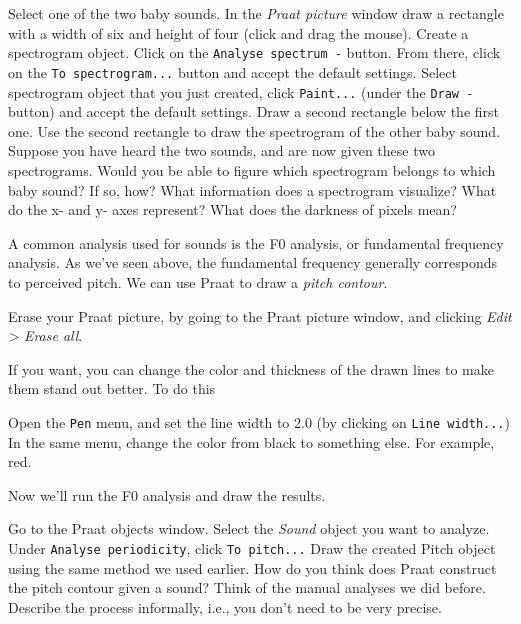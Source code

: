 \documentclass[a4paper, 9pt]{article}
\begin{document}
\begin{exercise}
\action Select one of the two baby sounds.
\action In the \textit{Praat picture} window draw a rectangle with a width of six and height of four (click and drag the mouse).
\action Create a spectrogram object. Click on the \texttt{Analyse spectrum -} button. From there, click on the \texttt{To spectrogram...} button and accept the default settings.
\action Select spectrogram object that you just created, click \texttt{Paint...} (under the \texttt{Draw - } button) and accept the default settings.
\action Draw a second rectangle below the first one. Use the second rectangle to draw the spectrogram of the other baby sound.
\ask Suppose you have heard the two sounds, and are now given these two spectrograms. Would you be able to figure which spectrogram belongs to which baby sound? If so, how?
\askstar What information does a spectrogram visualize? What do the x- and y- axes represent? What does the darkness of pixels mean?
\end{exercise}

A common analysis used for sounds is the F0 analysis, or fundamental frequency analysis. As we've seen above, the fundamental frequency generally corresponds to perceived pitch. We can use Praat to draw a
\emph{pitch contour}.

\begin{exercise}
\action Erase your Praat picture, by going to the Praat picture window, and clicking \emph{Edit > Erase all}.
\end{exercise}

If you want, you can change the color and thickness of the drawn lines to make them stand out better. To do this

\begin{exercise}
\action Open the \texttt{Pen} menu, and set the line width to 2.0 (by clicking on \texttt{Line width...})
\action In the same menu, change the color from black to something else. For example, red. 
\end{exercise}

Now we'll run the F0 analysis and draw the results.

\begin{exercise}
\action Go to the Praat objects window.
\action Select the \emph{Sound} object you want to analyze.
\action Under \texttt{Analyse periodicity}, click \texttt{To pitch...}
\action Draw the created Pitch object using the same method we used earlier.
\ask How do you think does Praat construct the pitch contour given a sound? Think of the manual analyses we did before. Describe the process informally, i.e., you don't need to be very precise.
\end{exercise}
\end{document}
